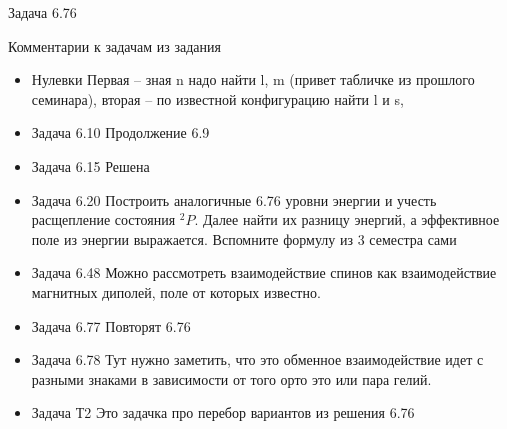 \documentclass[12]{beamer}
\begin{document}
\begin{frame}{Задача 6.76}
\end{frame}



\begin{frame}[t]{Комментарии к задачам из задания}\scriptsize
\begin{itemize}
\item Нулевки   Первая -- зная n надо найти l, m (привет табличке из прошлого семинара), вторая -- по известной конфигурацию найти l и s, 
\item Задача 6.10  Продолжение 6.9
\item Задача 6.15  Решена
\item Задача 6.20  Построить аналогичные 6.76 уровни энергии и учесть расщепление состояния $^2P$. Далее найти их разницу энергий, а эффективное поле из энергии выражается. Вспомните формулу из 3 семестра сами 
\item Задача 6.48  Можно рассмотреть взаимодействие спинов как взаимодействие магнитных диполей, поле от которых известно.
\item Задача 6.77  Повторят 6.76
\item Задача 6.78  Тут нужно заметить, что это обменное взаимодействие идет с разными знаками в зависимости от того орто это или пара гелий.
\item Задача Т2  Это задачка про перебор вариантов из решения 6.76
\end{itemize}
\end{frame}
\end{document}

